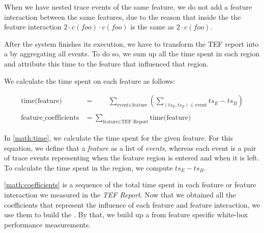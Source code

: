 When we have nested trace events of the same feature, we do not add a feature interaction between the same features, 
due to the reason that inside the {\perfInfluenceModel} the feature interaction $2 \cdot c(foo) \cdot c(foo)$ is the same as $2 \cdot c(foo)$.

After the system finishes its execution, we have to transform the TEF report into a {\perfInfluenceModel} by aggregating all events. 
To do so, we sum up all the time spent in each region and attribute this time to the feature that influenced that region. 

We calculate the time spent on each feature as follows:


\begin{align}
    \text{time(feature)} &= \textit{ }\textit{ }\textit{ } \sum_{\text{event} \in \text{feature}} \left( \sum_{(ts_E, ts_B) \in \text{event}} ts_E - ts_B \right) \label{math:time} \\ \nonumber \\
    \text{feature\_coefficients} &= \sum_{\text{feature} \in \text{TEF Report}}\text{time(feature)} \label{math:coefficients}
\end{align}

In \autoref{math:time}, we calculate the time spent for the given feature. 
For this equation, we define that a \textit{feature} as a list of \textit{events}, 
whereas each event is a pair of trace events representing when the feature region is entered and when it is left. 
To calculate the time spent in the region, we compute $ts_E - ts_B$.

\autoref{math:coefficients} is a sequence of the total time spent in each feature or feature interaction we measured in the \textit{TEF Report}. 
Now that we obtained all the coefficients that represent the influence of each feature and feature interaction, we use them to build the \perfInfluenceModel.
By that, we build up a {\perfInfluenceModel} from feature specific white-box performance measurements.